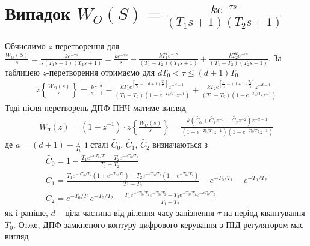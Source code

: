 \section{Випадок \texorpdfstring{$W_O(S) = \frac{k e^{-\tau s}}{(T_1 s + 1)(T_2 s + 1)}$}{4}}
Обчислимо $z$-перетворення для $\frac{W_O(S)}{s} = \frac{k e^{-\tau s}}{s(T_1 s + 1)(T_2 s + 1)} = 
\frac{k e^{-\tau s}}{s} - \frac{k T_1^2 e^{-\tau s}}{(T_1 - T_2) (T_1 s + 1)} + \frac{k T_2^2 e^{-\tau s}}{(T_1 - T_2) (T_2 s + 1)}$.
За таблицею $z$-перетворення отримаємо для $d T_0 < \tau \leq (d+1)T_0$
\begin{gather}
    z\left\{\frac{W_O(s)}{s} \right\} = \frac{k z^{-d}}{z - 1} - 
    \frac{k T_1 e^{\left[
        \frac{\tau}{T_1} - (d+1) \frac{T_0}{T_1}
     \right]} z^{-d-1}}
    {
        (T_1 - T_2) \left(1 - e^{-T_0 / T_1} z^{-1}\right)
    } +
    \frac{k T_2 e^{\left[
        \frac{\tau}{T_2} - (d+1) \frac{T_0}{T_2}
     \right]} z^{-d-1}}
    {
        (T_1 - T_2) \left(1 - e^{-T_0 / T_2} z^{-1}\right)
    } 
\end{gather}
Тоді після перетворень ДПФ ПНЧ матиме вигляд
\begin{gather}
    W_{\text{п}}(z) = \left(1 - z^{-1}\right) \cdot z\left\{\frac{W_O(s)}{s} \right\} = 
    \frac{
        k \left(\tilde{C_0} + \tilde{C_1} z^{-1} + \tilde{C_2} z^{-2}\right) z^{-d-1}
    }{
        \left(1 - e^{-T_0 / T_1} z^{-1}\right)
        \left(1 - e^{-T_0 / T_2} z^{-1}\right)
    }
\end{gather}
де $a = (d+1) - \frac{\tau}{T_0}$ і сталі $\tilde{C_0}$, $\tilde{C_1}$, $\tilde{C_2}$ визначаються з
\begin{gather*}
    \tilde{C_0} = 1 - \frac{
        T_1 e^{- a T_0 / T_1} - 
        T_2 e^{- a T_0 / T_2}
    }{T_1 - T_2} \\
    \tilde{C_1} = 
    \frac{
        T_1 e^{- a T_0 / T_1} \left(1 + e^{- T_0 / T_2}\right) - 
        T_2 e^{- a T_0 / T_2} \left(1 + e^{- T_0 / T_1}\right)
    }{
        T_1 - T_2 
    } - e^{-T_0 / T_1} - e^{-T_0 / T_2} \\
    \tilde{C_2} = 
    e^{- T_0 / T_1} e^{- T_0 / T_2} - 
    \frac{
        T_1 e^{- a T_0/ T_1} e^{-T_0 / T_2} - 
        T_2 e^{-T_0 / T_1} e^{- a T_0 / T_2}
    }{
        T_1 - T_2
    }
\end{gather*}
як і раніше, $d$ -- ціла частина від ділення часу запізнення $\tau$ на період квантування
$T_0$. Отже, ДПФ замкненого контуру цифрового керування з ПІД-регулятором має вигляд
